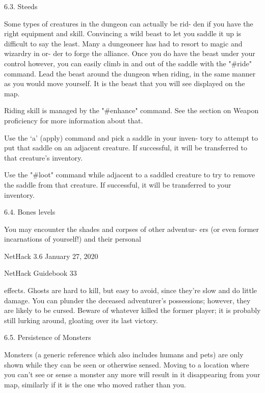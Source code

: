 \documentclass[11pt]{article}
\begin{document}
6.3. Steeds

   Some types of creatures in the dungeon can actually be rid-
den if you have the right equipment and skill. Convincing a wild
beast to let you saddle it up is difficult to say the least.
Many a dungeoneer has had to resort to magic and wizardry in or-
der to forge the alliance. Once you do have the beast under your
control however, you can easily climb in and out of the saddle
with the "\#ride" command. Lead the beast around the dungeon when
riding, in the same manner as you would move yourself. It is the
beast that you will see displayed on the map.

   Riding skill is managed by the "\#enhance" command. See the
section on Weapon proficiency for more information about that.

   Use the `a' (apply) command and pick a saddle in your inven-
tory to attempt to put that saddle on an adjacent creature. If
successful, it will be transferred to that creature's inventory.

   Use the "\#loot" command while adjacent to a saddled creature
to try to remove the saddle from that creature. If successful,
it will be transferred to your inventory.

6.4. Bones levels

   You may encounter the shades and corpses of other adventur-
ers (or even former incarnations of yourself!) and their personal


NetHack 3.6                   January 27, 2020





NetHack Guidebook                       33



effects. Ghosts are hard to kill, but easy to avoid, since
they're slow and do little damage. You can plunder the deceased
adventurer's possessions; however, they are likely to be cursed.
Beware of whatever killed the former player; it is probably still
lurking around, gloating over its last victory.

6.5. Persistence of Monsters

   Monsters (a generic reference which also includes humans and
pets) are only shown while they can be seen or otherwise sensed.
Moving to a location where you can't see or sense a monster any
more will result in it disappearing from your map, similarly if
it is the one who moved rather than you.
\end{document}
